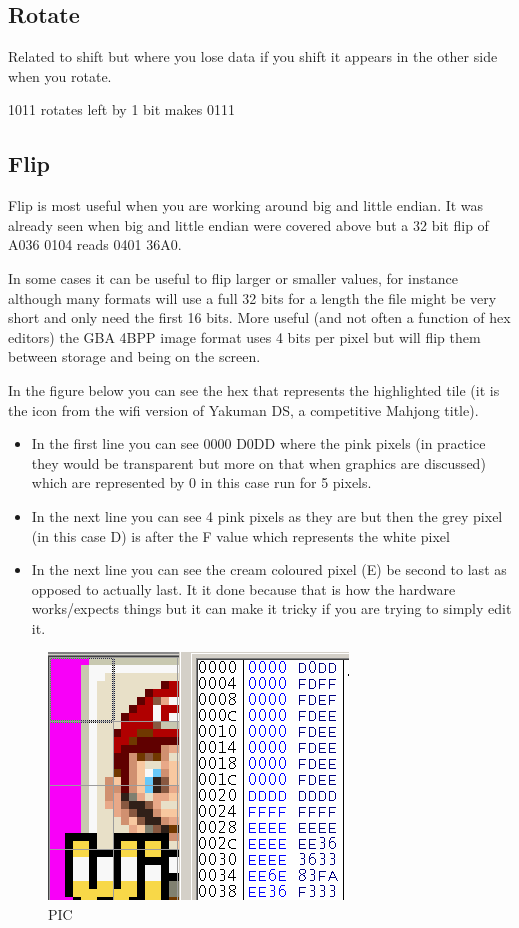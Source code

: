 \documentclass[
]{book}
\providecommand{\tightlist}{%
  \setlength{\itemsep}{0pt}\setlength{\parskip}{0pt}}
\begin{document}
\hypertarget{rotate}{%
\subsection{Rotate}\label{rotate}}

Related to shift but where you lose data if you shift it appears in the other side when you rotate.

1011 rotates left by 1 bit makes 0111

\hypertarget{flip}{%
\subsection{Flip}\label{flip}}

Flip is most useful when you are working around big and little endian. It was already seen when big and little endian were covered above but a 32 bit flip of A036 0104 reads 0401 36A0.

In some cases it can be useful to flip larger or smaller values, for instance although many formats will use a full 32 bits for a length the file might be very short and only need the first 16 bits. More useful (and not often a function of hex editors) the GBA 4BPP image format uses 4 bits per pixel but will flip them between storage and being on the screen.

In the figure below you can see the hex that represents the highlighted tile (it is the icon from the wifi version of Yakuman DS, a competitive Mahjong title).

\begin{itemize}
\tightlist
\item
  In the first line you can see 0000 D0DD where the pink pixels (in practice they would be transparent but more on that when graphics are discussed) which are represented by 0 in this case run for 5 pixels.
\item
  In the next line you can see 4 pink pixels as they are but then the grey pixel (in this case D) is after the F value which represents the white pixel
\item
  In the next line you can see the cream coloured pixel (E) be second to last as opposed to actually last. It it done because that is how the hardware works/expects things but it can make it tricky if you are trying to simply edit it.
\end{itemize}

\begin{figure}
\centering
\includegraphics{images/0_home_fast6191_romhackingguide_unrenamed_files_and_original_borders_romhackingendiandemo.png}
\caption{PIC}
\end{figure}
\end{document}
